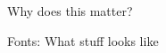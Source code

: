 \documentclass[../index.tex]{subfiles}
\begin{document}
\begin{frame}{\currenttitle}
%
%
%
  \begin{columns}[t]
    \textbf{}
  \end{columns}
\end{frame}

\renewcommand{\currenttitle}{Why does this matter?}
\begin{frame}{\currenttitle}
%
%
\end{frame}

\renewcommand{\currenttitle}{Fonts: What stuff looks like}
\begin{frame}{\currenttitle}
%
%
%
%
\end{frame}
\end{document}
